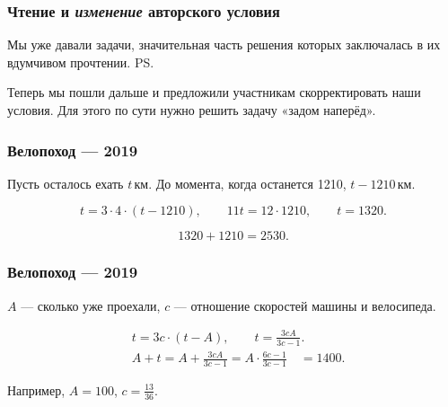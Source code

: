 \begin{frame}
\frametitle{Чтение и {\it изменение} авторского условия}
	Мы уже давали задачи, значительная часть решения которых заключалась в их вдумчивом прочтении. \ps
	
	Теперь мы пошли дальше и предложили участникам скорректировать наши условия. Для этого по сути нужно решить задачу «задом наперёд».
\end{frame}

\begin{frame}
\frametitle{Велопоход — 2019}


Пусть осталось ехать $t$\,км. До момента, когда останется 1210, $t-1210$\,км.
\vspace{-3mm}

$$t = 3 \cdot 4 \cdot (t - 1210),\qquad 11t = 12 \cdot 1210,\qquad t = 1320.$$ \vspace{-12mm}

$$1320+1210 = 2530.$$
\end{frame}

\begin{frame}
\frametitle{Велопоход — 2019}


$A$ — сколько уже проехали, $c$ — отношение скоростей машины и велосипеда. \vspace{-5mm}

\begin{align*}
& t = 3c \cdot (t-A),\qquad t = \frac{3cA}{3c-1}. \\
& A + t = A + \frac{3cA}{3c-1} = A \cdot \frac{6c-1}{3c-1}\quad = 1400.
\end{align*}

Например, $A=100$, $c = \frac{13}{36}$.
\end{frame}